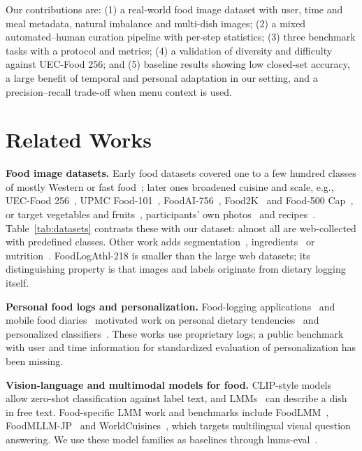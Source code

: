 \documentclass[sigconf, nonacm]{acmart}
\begin{document}
Our contributions are: (1) a real-world food image dataset with user, time and meal metadata, natural imbalance and multi-dish images; (2) a mixed automated--human curation pipeline with per-step statistics; (3) three benchmark tasks with a protocol and metrics; (4) a validation of diversity and difficulty against UEC-Food 256; and (5) baseline results showing low closed-set accuracy, a large benefit of temporal and personal adaptation in our setting, and a precision--recall trade-off when menu context is used.

\section{Related Works}
\textbf{Food image datasets.} Early food datasets covered one to a few hundred classes of mostly Western or fast food~\cite{chen2009pfid,bossard2014food}; later ones broadened cuisine and scale, e.g., UEC-Food 256~\cite{kawano2015automatic}, UPMC Food-101~\cite{wang2015recipe}, FoodAI-756~\cite{sahoo2019foodai}, Food2K~\cite{min2023large} and Food-500 Cap~\cite{ma2023food}, or target vegetables and fruits~\cite{hou2017vegfru}, participants' own photos~\cite{farinella2016retrieval} and recipes~\cite{marin2019learning,harashima2017cookpad}. Table~\ref{tab:datasets} contrasts these with our dataset: almost all are web-collected with predefined classes. Other work adds segmentation~\cite{wu2021large}, ingredients~\cite{chen2020study} or nutrition~\cite{thames2021nutrition5k}. FoodLogAthl-218 is smaller than the large web datasets; its distinguishing property is that images and labels originate from dietary logging itself.

\textbf{Personal food logs and personalization.} Food-logging applications~\cite{aizawa2015foodlog,nakamoto2022foodlog,asken,myfitnesspal} and mobile food diaries~\cite{meyers2015im2calories} motivated work on personal dietary tendencies~\cite{Aizawa2013FoodBalance} and personalized classifiers~\cite{flg469}. These works use proprietary logs; a public benchmark with user and time information for standardized evaluation of personalization has been missing.

\textbf{Vision-language and multimodal models for food.} CLIP-style models~\cite{CLIP,sun2023eva} allow zero-shot classification against label text, and LMMs~\cite{liu2024visual,liu2024improved,bai2023qwen} can describe a dish in free text. Food-specific LMM work and benchmarks include FoodLMM~\cite{yin2023foodlmm}, FoodMLLM-JP~\cite{Imajuku2025FoodMLLM} and WorldCuisines~\cite{winata2024worldcuisines}, which targets multilingual visual question answering. We use these model families as baselines through lmms-eval~\cite{lmms_eval2024,zhang2024lmmsevalrealitycheckevaluation}.
\end{document}
